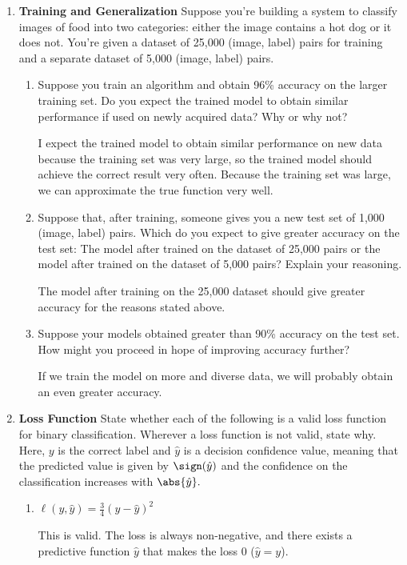 \documentclass{article}
\begin{document}
\begin{enumerate}[1)]
		\newpage
	\item \textbf{Training and Generalization} Suppose you're building a system to classify images of food into two categories: either the image contains a hot dog or it does not. You're given a dataset of 25,000 (image, label) pairs for training and a separate dataset of 5,000 (image, label) pairs.
		\begin{enumerate}[1.]
			\item Suppose you train an algorithm and obtain 96\% accuracy on the larger training set. Do you expect the trained model to obtain similar performance if used on newly acquired data? Why or why not?
				\begin{answer*}
					I expect the trained model to obtain similar performance on new data because the training set was very large, so the trained model should achieve the correct result very often. Because the training set was large, we can approximate the true function very well.
				\end{answer*}

			\item Suppose that, after training, someone gives you a new test set of 1,000 (image, label) pairs. Which do you expect to give greater accuracy on the test set: The model after trained on the dataset of 25,000 pairs or the model after trained on the dataset of 5,000 pairs? Explain your reasoning.
				\begin{answer*}
					The model after training on the 25,000 dataset should give greater accuracy for the reasons stated above.
				\end{answer*}

			\item Suppose your models obtained greater than 90\% accuracy on the test set. How might you proceed in hope of improving accuracy further?
				\begin{answer*}
					If we train the model on more and diverse data, we will probably obtain an even greater accuracy.
				\end{answer*}

		\end{enumerate}

		\newpage
	\item \textbf{Loss Function} State whether each of the following is a valid loss function for binary classification. Wherever a loss function is not valid, state why. Here, $y$ is the correct label and $\hat y$ is a decision confidence value, meaning that the predicted value is given by $\sign(\hat y)$ and the confidence on the classification increases with $\abs{\hat y}.$
		\begin{enumerate}[1.]
			\item $\ell(y, \hat y)=\frac{3}{4}\left( y-\hat y \right)^2$
				\begin{answer*}
					This is valid. The loss is always non-negative, and there exists a predictive function $\hat y$ that makes the loss 0 ($\hat y=y$).
				\end{answer*}


\end{enumerate}
\end{enumerate}
\end{document}
